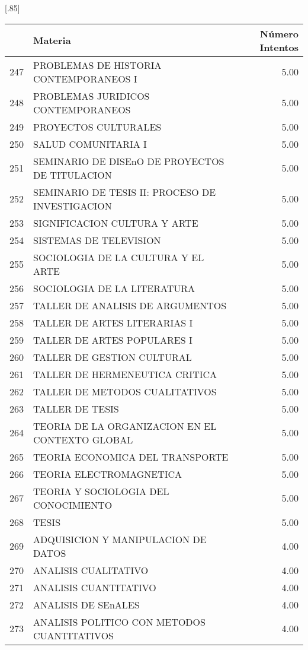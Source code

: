 \documentclass[12pt]{article}
\begin{document}
\begin{table}[ht]
\centering
\scalebox{0.75}[.85]{
\begin{tabular}{rlr}
  \hline
 & Materia & N\'umero Intentos\\   
  \hline
  247 & PROBLEMAS DE HISTORIA CONTEMPORANEOS I & 5.00 \\ 
  248 & PROBLEMAS JURIDICOS CONTEMPORANEOS & 5.00 \\ 
  249 & PROYECTOS CULTURALES & 5.00 \\ 
  250 & SALUD COMUNITARIA I & 5.00 \\ 
  251 & SEMINARIO DE DISEnO DE PROYECTOS DE TITULACION & 5.00 \\ 
  252 & SEMINARIO DE TESIS II: PROCESO DE INVESTIGACION & 5.00 \\ 
  253 & SIGNIFICACION CULTURA Y ARTE & 5.00 \\ 
  254 & SISTEMAS DE TELEVISION & 5.00 \\ 
  255 & SOCIOLOGIA DE LA CULTURA Y EL ARTE & 5.00 \\ 
  256 & SOCIOLOGIA DE LA LITERATURA & 5.00 \\ 
  257 & TALLER DE ANALISIS DE ARGUMENTOS & 5.00 \\ 
  258 & TALLER DE ARTES LITERARIAS I & 5.00 \\ 
  259 & TALLER DE ARTES POPULARES I & 5.00 \\ 
  260 & TALLER DE GESTION CULTURAL & 5.00 \\ 
  261 & TALLER DE HERMENEUTICA CRITICA & 5.00 \\ 
  262 & TALLER DE METODOS CUALITATIVOS & 5.00 \\ 
  263 & TALLER DE TESIS & 5.00 \\ 
  264 & TEORIA DE LA ORGANIZACION EN EL CONTEXTO GLOBAL & 5.00 \\ 
  265 & TEORIA ECONOMICA DEL TRANSPORTE & 5.00 \\ 
  266 & TEORIA ELECTROMAGNETICA & 5.00 \\ 
  267 & TEORIA Y SOCIOLOGIA DEL CONOCIMIENTO & 5.00 \\ 
  268 & TESIS & 5.00 \\ 
  269 & ADQUISICION Y MANIPULACION DE DATOS & 4.00 \\ 
  270 & ANALISIS CUALITATIVO & 4.00 \\ 
  271 & ANALISIS CUANTITATIVO & 4.00 \\ 
  272 & ANALISIS DE SEnALES & 4.00 \\ 
  273 & ANALISIS POLITICO CON METODOS CUANTITATIVOS & 4.00 \\ 

\end{tabular}}
\end{table}
\end{document}
